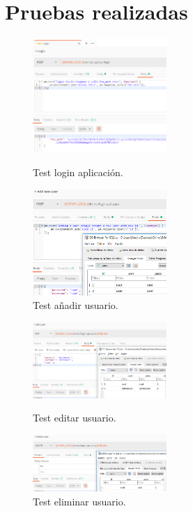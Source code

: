 \chapter{Pruebas realizadas}
\label{Anexo:pruebas}

\begin{figure}[!htb]
\includegraphics[width=2.00in]{images/tests/screenshots/1login.PNG}
\caption{Test login aplicación.}
\endminipage\hfill
{}
\includegraphics[width=2.00in]{images/tests/screenshots/2newuser.PNG}
\caption{Test añadir usuario.}
\endminipage\hfill
\end{figure}

\begin{figure}[!htb]
\includegraphics[width=2.00in]{images/tests/screenshots/3edituser.PNG}
\caption{Test editar usuario.}
\endminipage\hfill
{}
\includegraphics[width=2.00in]{images/tests/screenshots/4deleteuser.PNG}
\caption{Test eliminar usuario.}
\endminipage\hfill
\end{figure}

